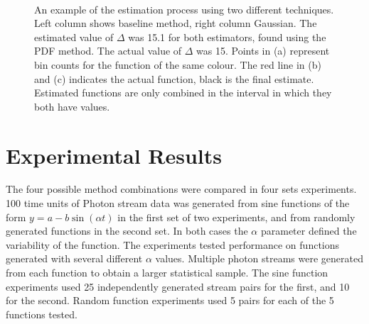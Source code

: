 \documentclass[a4paper,11pt]{article}
\begin{document}
\begin{figure}[]
{   }\\

   \caption{An example of the estimation process using two different
   techniques. Left column shows baseline method, right column Gaussian. The
   estimated value of $\Delta$ was 15.1 for both estimators, found using the PDF
   method. The actual value of $\Delta$ was 15. Points in (a) represent bin
   counts for the function of the same colour. The red line in (b) and (c)
   indicates the actual function, black is the final estimate. Estimated
   functions are only combined in the interval in which they both have values.}

   \label{fig:finest}
   \end{figure}
\section{Experimental Results}
\label{sec-5}

  The four possible method combinations were compared in four sets
  experiments. 100 time units of Photon stream data was generated from sine
  functions of the form $y=a-b\sin(\alpha t)$ in the first set of two
  experiments, and from randomly generated functions in the second set. In both
  cases the $\alpha$ parameter defined the variability of the function. The
  experiments tested performance on functions generated with several different
  $\alpha$ values. Multiple photon streams were generated from each function to
  obtain a larger statistical sample. The sine function experiments used 25
  independently generated stream pairs for the first, and 10 for the
  second. Random function experiments used 5 pairs for each of the 5 functions
  tested.
\end{document}
